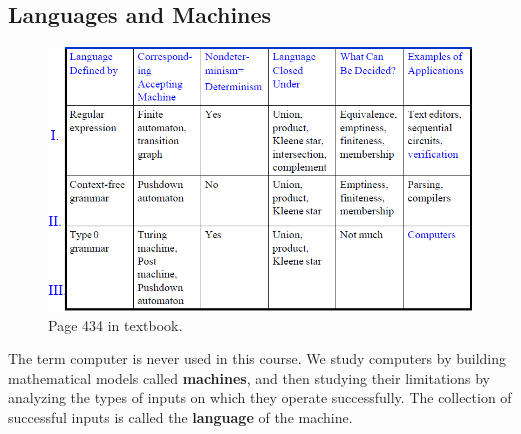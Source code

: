 \subsection{Languages and Machines}
\begin{figure}[!ht]
    \centering
    \includegraphics[width=\linewidth]{lecture 1/figures/page434.png}
    \caption{Page 434 in textbook.}
\end{figure}
The term computer is never used in this course. We study computers by building mathematical models called \textbf{machines}, and then studying their limitations by analyzing the types of inputs on which they operate successfully. The collection of successful inputs is called the \textbf{language} of the machine.